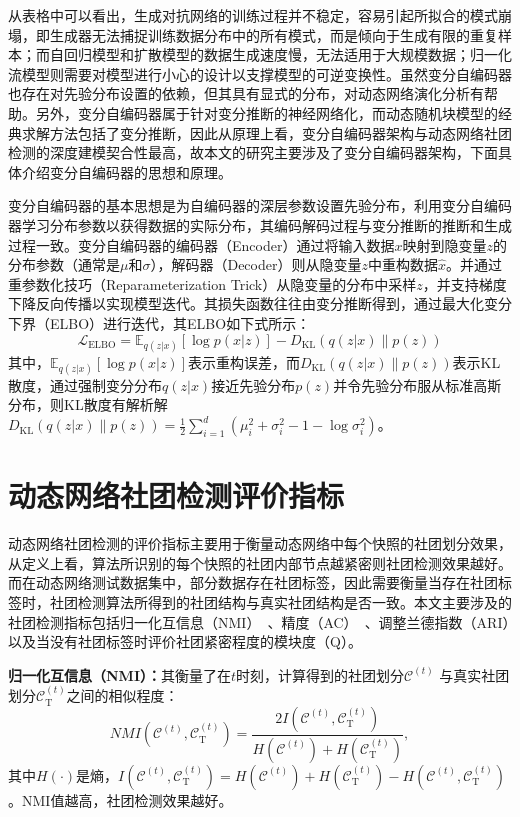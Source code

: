 从表格中可以看出，生成对抗网络的训练过程并不稳定，容易引起所拟合的模式崩塌，即生成器无法捕捉训练数据分布中的所有模式，而是倾向于生成有限的重复样本；而自回归模型和扩散模型的数据生成速度慢，无法适用于大规模数据；归一化流模型则需要对模型进行小心的设计以支撑模型的可逆变换性。虽然变分自编码器也存在对先验分布设置的依赖，但其具有显式的分布，对动态网络演化分析有帮助。另外，变分自编码器属于针对变分推断的神经网络化，而动态随机块模型的经典求解方法包括了变分推断，因此从原理上看，变分自编码器架构与动态网络社团检测的深度建模契合性最高，故本文的研究主要涉及了变分自编码器架构，下面具体介绍变分自编码器的思想和原理。

变分自编码器的基本思想是为自编码器的深层参数设置先验分布，利用变分自编码器学习分布参数以获得数据的实际分布，其编码解码过程与变分推断的推断和生成过程一致。变分自编码器的编码器（Encoder）通过将输入数据$x$映射到隐变量$z$的分布参数（通常是$\mu$和$\sigma$），解码器（Decoder）则从隐变量$z$中重构数据$\hat{x}$。并通过重参数化技巧（Reparameterization Trick）从隐变量的分布中采样$z$，并支持梯度下降反向传播以实现模型迭代。其损失函数往往由变分推断得到，通过最大化变分下界（ELBO）进行迭代，其ELBO如下式所示：
\begin{equation}
	\mathcal{L}_{\text{ELBO}} = \mathbb{E}_{q(z|x)}[\log p(x|z)] - D_{\text{KL}}(q(z|x) \| p(z))
\end{equation}
其中，$\mathbb{E}_{q(z|x)}[\log p(x|z)]$表示重构误差，而$D_{\text{KL}}(q(z|x) \| p(z))$表示KL散度，通过强制变分分布$q(z|x)$接近先验分布$p(z)$并令先验分布服从标准高斯分布，则KL散度有解析解$D_{\text{KL}}(q(z|x) \| p(z))=\frac{1}{2}\sum_{i=1}^{d}(\mu_i^2+\sigma_i^2-1-\log \sigma_i^2)$。

\section{动态网络社团检测评价指标}
\label{chap2:metrics}
动态网络社团检测的评价指标主要用于衡量动态网络中每个快照的社团划分效果，从定义上看，算法所识别的每个快照的社团内部节点越紧密则社团检测效果越好。而在动态网络测试数据集中，部分数据存在社团标签，因此需要衡量当存在社团标签时，社团检测算法所得到的社团结构与真实社团结构是否一致。本文主要涉及的社团检测指标包括归一化互信息（NMI）~\cite{gong2007machine}、精度（AC）~\cite{folino2013evolutionary}、调整兰德指数（ARI）以及当没有社团标签时评价社团紧密程度的模块度（Q）。

\textbf{归一化互信息（NMI）：}其衡量了在$t$时刻，计算得到的社团划分$\mathcal{C}^{(t)}$ 与真实社团划分$\mathcal{C}_{\mathrm{T}}^{(t)}$之间的相似程度：
     \begin{equation}
          NMI(\mathcal{C}^{(t)},\mathcal{C}_{\mathrm{T}}^{(t)})= \frac{2I(\mathcal{C}^{(t)},\mathcal{C}_{\mathrm{T}}^{(t)})}{H(\mathcal{C}^{(t)})+H(\mathcal{C}_{\mathrm{T}}^{(t)})},
      \end{equation}
其中$H(\cdot)$是熵，$I(\mathcal{C}^{(t)},\mathcal{C}_{\mathrm{T}}^{(t)}) = H(\mathcal{C}^{(t)})+H(\mathcal{C}_{\mathrm{T}}^{(t)}) - H(\mathcal{C}^{(t)},\mathcal{C}_{\mathrm{T}}^{(t)})$。NMI值越高，社团检测效果越好。

